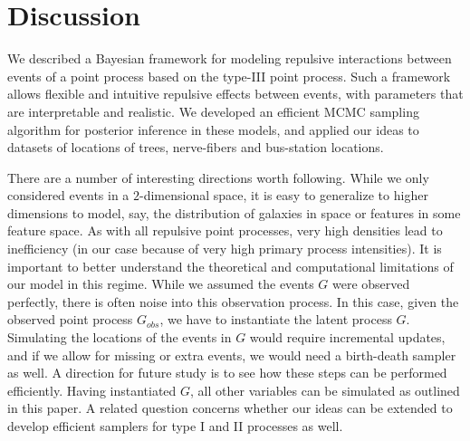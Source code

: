 \documentclass{statsoc}
\begin{document}
\section{Discussion}
We described a Bayesian framework for modeling repulsive interactions between events of a point process based on the \matern type-III point process. Such a framework allows flexible and intuitive repulsive effects between events, with parameters that are interpretable and realistic.
We developed an efficient MCMC sampling algorithm for posterior inference in these models,
and applied our ideas to datasets of locations of trees, nerve-fibers and bus-station locations.


There are a number of interesting directions worth following.
While we only considered events in a $2$-dimensional space,
it is easy to generalize to higher dimensions to model, say, the distribution of galaxies in space or features in some 
feature space.
As with all repulsive point processes, very high densities lead to inefficiency (in our case because of very high primary process intensities).
It is important to better understand the theoretical and computational limitations of our model in this regime.
While we assumed the \matern events $G$ were observed perfectly, there is often noise into this observation process. In this case, given
the observed point process $G_{obs}$, we have to instantiate the latent \matern process $G$. 
Simulating the locations of the events in $G$ would require incremental updates, and if we allow for missing or extra events, we would need a 
birth-death sampler as well. A direction for future study is to see how these steps can be performed efficiently.
Having instantiated $G$, all other variables can be simulated as outlined in this paper. 
A related question concerns whether our ideas can be extended to develop efficient samplers for \matern type I and II processes as well.
\end{document}
